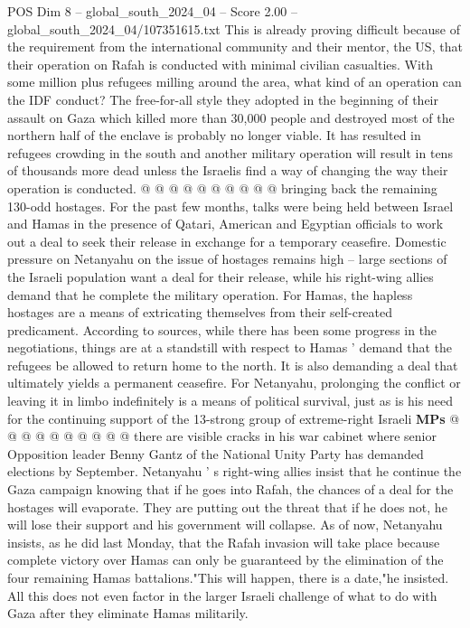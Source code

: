 \begin{textsample}{POS Dim 8 – global\_south\_2024\_04 – Score 2.00 – global\_south\_2024\_04/107351615.txt}
This is already proving difficult because of the requirement from the international community and their mentor, the US, that their operation on Rafah is conducted with minimal civilian casualties.
With some million plus refugees milling around the area, what kind of an operation can the IDF conduct?
The free-for-all style they adopted in the beginning of their assault on Gaza which killed more than 30,000 people and destroyed most of the northern half of the enclave is probably no longer viable.
It has resulted in refugees crowding in the south and another military operation will result in tens of thousands more dead unless the Israelis find a way of changing the way their operation is conducted. @ @ @ @ @ @ @ @ @ @ bringing back the remaining 130-odd hostages.
For the past few months, talks were being held between Israel and Hamas in the presence of Qatari, American and Egyptian officials to work out a deal to seek their release in exchange for a temporary ceasefire.
Domestic pressure on Netanyahu on the issue of hostages remains high -- large sections of the Israeli population want a deal for their release, while his right-wing allies demand that he complete the military operation.
For Hamas, the hapless hostages are a means of extricating themselves from their self-created predicament.
According to sources, while there has been some progress in the negotiations, things are at a standstill with respect to Hamas ' demand that the refugees be allowed to return home to the north.
It is also demanding a deal that ultimately yields a permanent ceasefire.
For Netanyahu, prolonging the conflict or leaving it in limbo indefinitely is a means of political survival, just as is his need for the continuing support of the 13-strong group of extreme-right Israeli \textbf{MPs} @ @ @ @ @ @ @ @ @ @ there are visible cracks in his war cabinet where senior Opposition leader Benny Gantz of the National Unity Party has demanded elections by September.
Netanyahu ' s right-wing allies insist that he continue the Gaza campaign knowing that if he goes into Rafah, the chances of a deal for the hostages will evaporate.
They are putting out the threat that if he does not, he will lose their support and his government will collapse.
As of now, Netanyahu insists, as he did last Monday, that the Rafah invasion will take place because complete victory over Hamas can only be guaranteed by the elimination of the four remaining Hamas battalions."This will happen, there is a date,"he insisted.
All this does not even factor in the larger Israeli challenge of what to do with Gaza after they eliminate Hamas militarily.

\end{textsample}
